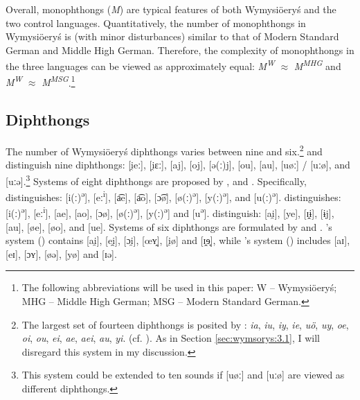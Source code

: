 \documentclass[output=paper,hidelinks]{langscibook}
\begin{document}
\largerpage
Overall, monophthongs (\textit{M}) are typical features of both Wymysiöeryś and the two control languages. Quantitatively, the number of monophthongs in Wymysiöeryś is (with minor disturbances) similar to that of Modern Standard German and Middle High German. Therefore, the complexity of monophthongs in the three languages can be viewed as approximately equal: \textit{M\textsuperscript{W}} ${\approx}$ \textit{M\textsuperscript{MHG} }and \textit{M\textsuperscript{W}} ${\approx}$ \textit{M\textsuperscript{MSG}}.\footnote{The following abbreviations will be used in this paper: W – Wymysiöeryś; MHG – Middle High German; MSG – Modern Standard German.}


\subsection{Diphthongs}\label{sec:wymsorys:3.2}


The number of Wymysiöeryś diphthongs varies between nine and six.\footnote{The largest set of fourteen diphthongs is posited by \citet[270]{latosinski_monografia_1909}: \textit{ia}, \textit{iu}, \textit{iy}, \textit{ie}, \textit{uö}, \textit{uy}, \textit{oe}, \textit{oi}, \textit{ou}, \textit{ei}, \textit{ae}, \textit{aei}, \textit{au}, \textit{yi}. (cf. \citealt[411]{wicherkiewicz_making_2003}). As in Section \ref{sec:wymsorys:3.1}, I will disregard this system in my discussion.} \citet[12--13]{kleczkowski_dialekt_1920} and \citet[xiii--xiv]{mojmir_worterbuch} distinguish nine diphthongs: [i̯eː], [i̯ɛː], [aj], [oj], [ə(ː)j], [ou], [au], [uøː] / [uːø], and [uːə].\footnote{This system could be extended to ten sounds if [uøː] and [uːø] are viewed as different diphthongs.} Systems of eight diphthongs are proposed by \citet{lasatowicz_deutsche_1994, wicherkiewicz_making_2003}, and \citet{zieniukowa_sutuacja_2001}. Specifically, \citet[33, 40--41]{lasatowicz_deutsche_1994} distinguishes: [i(ː)\textsuperscript{ə}], [eː\textsuperscript{i}], [a͡e], [a͡o], [ɔ͡ø], [ø(ː)\textsuperscript{ə}], [y(ː)\textsuperscript{ə}], and [u(ː)\textsuperscript{ə}]. \citet[407--408]{wicherkiewicz_making_2003} distinguishes: [i(ː)\textsuperscript{ə}], [eː\textsuperscript{i}], [ae], [ao], [ɔø], [ø(ː)\textsuperscript{ə}], [y(ː)\textsuperscript{ə}] and [u\textsuperscript{ə}]. \citet[499--500]{zieniukowa_sutuacja_2001} distinguish: [ai̯], [ye], [ɪ̯ɨ], [ɨj], [au], [øe], [øo], and [ue]. Systems of six diphthongs are formulated by \citet{andrason_grammar_2016} and \citet{weckwerth_polands_2015}. \citeauthor{andrason_grammar_2016}'s system (\citeyear[21]{andrason_grammar_2016}) contains [ai̯], [ei̯̯], [ɔi̯], [œʏ̯], [i̯ø] and [ɪ̯ɘ̟], while \citeauthor{weckwerth_polands_2015}'s system (\citeyear[1]{weckwerth_polands_2015}) includes [aɪ], [eɪ], [ɔʏ], [øə], [yø] and [ɪə].
\end{document}
